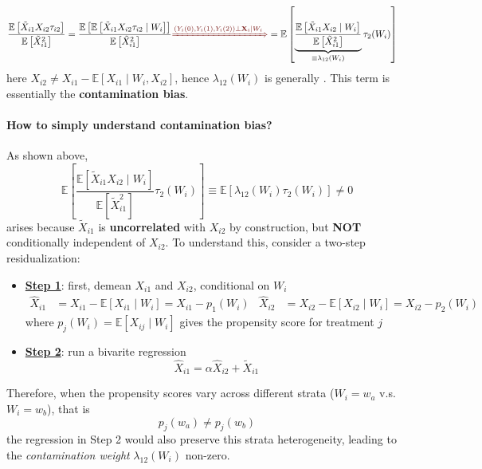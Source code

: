 \documentclass[twoside]{article}
\begin{document}
\begin{itemize}
    \begin{align*}
        \frac{\mathbb{E}\left[ \tilde{X}_{i1} X_{i2}\tau_{i2} \right]}{\mathbb{E}\left[ \tilde{X}^2_{i1} \right]} &= \frac{\mathbb{E}\left[ \mathbb{E}\left[\tilde{X}_{i1} X_{i2}\tau_{i2}\mid W_i\right] \right]}{\mathbb{E}\left[ \tilde{X}^2_{i1} \right]} \textcolor{myred}{\xRightarrow{\left( Y_i(0),Y_i(1),Y_i(2) \right) \bot \mathbf{X}_i \mid W_i}} = \mathbb{E}\left[ \underbrace{\frac{\mathbb{E}\left[\tilde{X}_{i1}X_{i2}\mid W_i\right]}{\mathbb{E}\left[\tilde{X}_{i1}^2\right]}}_{\equiv \lambda_{12}(W_i)} \tau_2(W_i)\right]
    \end{align*}
    here $X_{i2} \neq X_{i1} - \mathbb{E}\left[ X_{i1} \mid W_i, X_{i2} \right] $, hence $\lambda_{12}(W_i)$ is generally . This term is essentially the \textbf{contamination bias}.
\end{itemize}

\paragraph*{How to simply understand contamination bias?}
As shown above,
\begin{equation*}
    \mathbb{E}\left[ \frac{\mathbb{E}\left[\tilde{X}_{i1}X_{i2}\mid W_i\right]}{\mathbb{E}\left[\tilde{X}_{i1}^2\right]} \tau_2(W_i)\right] \equiv \mathbb{E}\left[ \lambda_{12}(W_i) \tau_2(W_i)\right] \neq 0
\end{equation*}
arises because $\tilde{X}_{i1}$ is \textbf{uncorrelated} with $X_{i2}$ by construction, but \textbf{NOT} conditionally independent of $X_{i2}$. To understand this, consider a two-step residualization:
\begin{itemize}
    \item \underline{\textbf{Step 1}}: first, demean $X_{i1}$ and $X_{i2}$, conditional on $W_i$
    \begin{align*}
        \hat{X}_{i1} &= X_{i1} - \mathbb{E}\left[X_{i1} \mid W_i\right] = X_{i1}- p_1(W_i) & \hat{X}_{i2}&= X_{i2}-\mathbb{E}\left[X_{i2}\mid W_i\right] = X_{i2} - p_2(W_i)
    \end{align*}
    where $p_j(W_i) = \mathbb{E}\left[X_{ij}\mid W_i\right]$ gives the propensity score for treatment $j$
    \item \underline{\textbf{Step 2}}: run a bivarite regression 
    $$
    \hat{X}_{i1} = \alpha \hat{X}_{i2} + \tilde{X}_{i1}
    $$
\end{itemize}
Therefore, when the propensity scores vary across different strata ($W_i=w_a$ v.s. $W_i=w_b$), that is $$ p_j(w_a) \neq p_j(w_b) $$
the regression in Step 2 would also preserve this strata heterogeneity, leading to the \textit{contamination weight} $\lambda_{12}(W_i)$ non-zero.
\end{document}
